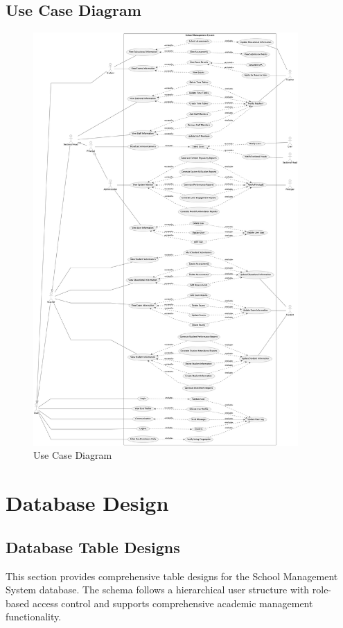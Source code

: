 \documentclass[12pt,a4paper]{report}
\begin{document}
\subsection{Use Case Diagram}
\begin{figure}[htbp]
    \centering
    \includegraphics[width=0.9\textwidth]{use-case-diagram.png}
    \caption{Use Case Diagram}
    \label{fig:use-case-diagram}
\end{figure}

\section{Database Design}
\subsection{Database Table Designs}
This section provides comprehensive table designs for the School Management System database. The schema follows a hierarchical user structure with role-based access control and supports comprehensive academic management functionality.
\end{document}
